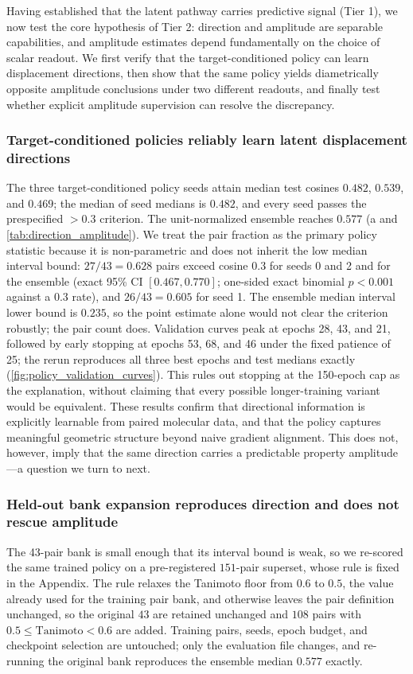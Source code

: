 \documentclass[11pt]{article}
\begin{document}
Having established that the latent pathway carries predictive signal (Tier 1), we now test the core hypothesis of Tier 2: direction and amplitude are separable capabilities, and amplitude estimates depend fundamentally on the choice of scalar readout. We first verify that the target-conditioned policy can learn displacement directions, then show that the same policy yields diametrically opposite amplitude conclusions under two different readouts, and finally test whether explicit amplitude supervision can resolve the discrepancy.

\subsubsection{Target-conditioned policies reliably learn latent displacement directions} The three target-conditioned policy seeds attain median test cosines $0.482$, $0.539$, and $0.469$; the median of seed medians is $0.482$, and every seed passes the prespecified $>0.3$ criterion. The unit-normalized ensemble reaches $0.577$ (a and \cref{tab:direction_amplitude}). We treat the pair fraction as the primary policy statistic because it is non-parametric and does not inherit the low median interval bound: $27/43=0.628$ pairs exceed cosine $0.3$ for seeds 0 and 2 and for the ensemble (exact 95\% CI $[0.467,0.770]$; one-sided exact binomial $p<0.001$ against a $0.3$ rate), and $26/43=0.605$ for seed 1. The ensemble median interval lower bound is $0.235$, so the point estimate alone would not clear the criterion robustly; the pair count does. Validation curves peak at epochs 28, 43, and 21, followed by early stopping at epochs 53, 68, and 46 under the fixed patience of 25; the rerun reproduces all three best epochs and test medians exactly (\cref{fig:policy_validation_curves}). This rules out stopping at the 150-epoch cap as the explanation, without claiming that every possible longer-training variant would be equivalent. These results confirm that directional information is explicitly learnable from paired molecular data, and that the policy captures meaningful geometric structure beyond naive gradient alignment. This does not, however, imply that the same direction carries a predictable property amplitude---a question we turn to next.

\subsubsection{Held-out bank expansion reproduces direction and does not rescue amplitude} The 43-pair bank is small enough that its interval bound is weak, so we re-scored the same trained policy on a pre-registered $151$-pair superset, whose rule is fixed in the Appendix. The rule relaxes the Tanimoto floor from $0.6$ to $0.5$, the value already used for the training pair bank, and otherwise leaves the pair definition unchanged, so the original $43$ are retained unchanged and $108$ pairs with $0.5\leq\mathrm{Tanimoto}<0.6$ are added. Training pairs, seeds, epoch budget, and checkpoint selection are untouched; only the evaluation file changes, and re-running the original bank reproduces the ensemble median $0.577$ exactly.
\end{document}
